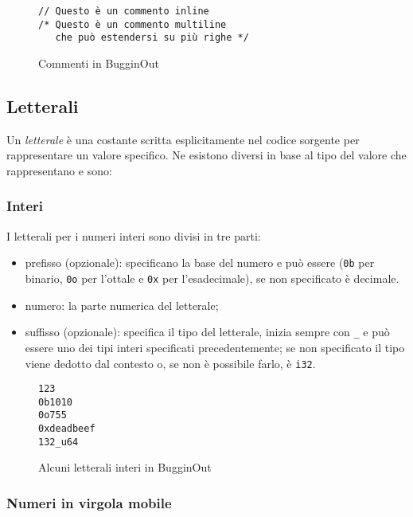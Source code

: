 \begin{figure}[H]
	\centering
	\begin{verbatim}
// Questo è un commento inline
/* Questo è un commento multiline
   che può estendersi su più righe */
	\end{verbatim}
	\caption{Commenti in BugginOut}
	\label{fig:comments-example}
\end{figure}

\subsection{Letterali}
\label{ssec:letterali}

Un \emph{letterale} \`e una costante scritta esplicitamente nel codice sorgente per rappresentare un valore specifico. Ne esistono diversi in base al tipo del valore che rappresentano e sono:

\subsubsection{Interi}

I letterali per i numeri interi sono divisi in tre parti:
	\begin{itemize}
		\item prefisso (opzionale): specificano la base del numero e pu\`o essere (\texttt{0b} per binario, \texttt{0o} per l'ottale e \texttt{0x} per l'esadecimale), se non specificato \`e decimale.
		\item numero: la parte numerica del letterale;
		\item suffisso (opzionale): specifica il tipo del letterale, inizia sempre con \texttt{\_} e pu\`o essere uno dei tipi interi specificati precedentemente; se non specificato il tipo viene dedotto dal contesto o, se non \`e possibile farlo, \`e \texttt{i32}.
	\end{itemize}

\begin{figure}[H]
	\centering
	\begin{verbatim}
123
0b1010
0o755
0xdeadbeef
132_u64
	\end{verbatim}
	\caption{Alcuni letterali interi in BugginOut}
	\label{fig:integer-literals-example}
\end{figure}

\subsubsection{Numeri in virgola mobile}

